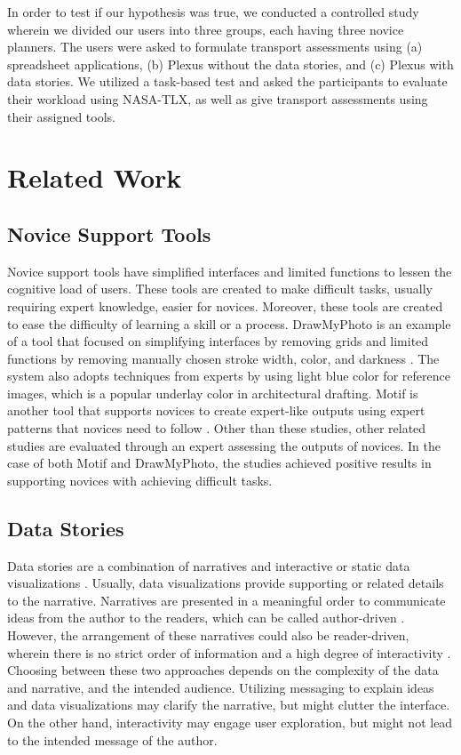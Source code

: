 \documentclass{sigchi}
\begin{document}
In order to test if our hypothesis was true, we conducted a controlled study wherein we divided our users into three groups, each having three novice planners. The users were asked to formulate transport assessments using (a) spreadsheet applications, (b) Plexus without the data stories, and (c) Plexus with data stories. We utilized a task-based test and asked the participants to evaluate their workload using NASA-TLX, as well as give transport assessments using their assigned tools. 

\section{Related Work}

\subsection{Novice Support Tools}
Novice support tools have simplified interfaces and limited functions to lessen the cognitive load of users. These tools are created to make difficult tasks, usually requiring expert knowledge, easier for novices. Moreover, these  tools are created to ease the difficulty of learning a skill or a process. DrawMyPhoto is an example of a tool that focused on simplifying interfaces by removing grids and limited functions by removing manually chosen stroke width, color, and darkness \cite{Williford2019}. The system also adopts techniques from experts by using light blue color for reference images, which is a popular underlay color in architectural drafting. Motif is another tool that supports novices to create expert-like outputs using expert patterns that novices need to follow \cite{Kim2015}. Other than these studies, other related studies are evaluated through an expert assessing the outputs of novices. In the case of both Motif and DrawMyPhoto, the studies achieved positive results in supporting novices with achieving difficult tasks.  

\subsection{Data Stories}
Data stories are a combination of narratives and interactive or static data visualizations \cite{Segel2011}. Usually, data visualizations provide supporting or related details to the narrative. Narratives are presented in a meaningful order to communicate ideas from the author to the readers, which can be called author-driven \cite{Lee2015}. However, the arrangement of these narratives could also be reader-driven, wherein there is no strict order of information and a high degree of interactivity \cite{Segel2011}. Choosing between these two approaches depends on the complexity of the data and narrative, and the intended audience. Utilizing messaging to explain ideas and data visualizations may clarify the narrative, but might clutter the interface. On the other hand, interactivity may engage user exploration, but might not lead to the intended message of the author. 
\end{document}
